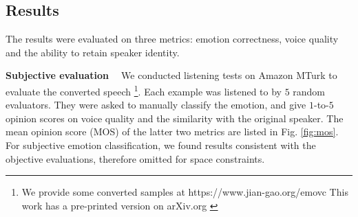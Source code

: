 \documentclass{article}
\begin{document}
\subsection{Results}
The results were evaluated on three metrics: emotion correctness, voice quality and the ability to retain speaker identity.

\noindent \textbf{Subjective evaluation \ } We conducted listening tests on Amazon MTurk to evaluate the converted speech \footnote{We provide some converted samples at https://www.jian-gao.org/emovc This work has a pre-printed version on arXiv.org \cite{DBLP:journals/corr/Jian18}}. Each example was listened to by $5$ random evaluators. They were asked to manually classify the emotion, and give $1$-to-$5$ opinion scores on voice quality and the similarity with the original speaker. The mean opinion score (MOS) of the latter two metrics are listed in Fig. \ref{fig:mos}. For subjective emotion classification, we found results consistent with the objective evaluations, therefore omitted for space constraints.
\end{document}
